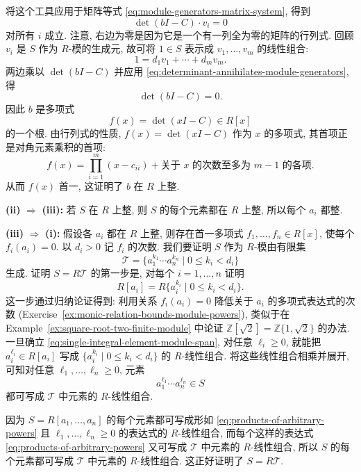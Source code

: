\begin{Proof}
  将这个工具应用于矩阵等式 \eqref{eq:module-generators-matrix-system}, 得到
  \begin{equation}\label{eq:determinant-annihilates-module-generators}
    \det(bI-C)\cdot v_{i}=0
  \end{equation}
  对所有 $i$ 成立. 注意, 右边为零是因为它是一个有一列全为零的矩阵的行列式. 回顾 $v_{i}$ 是 $S$ 作为 $R$-模的生成元, 故可将 $1\in S$ 表示成 $v_{1},\ldots,v_{m}$ 的线性组合:
  \[
    1=d_{1}v_{1}+\cdots+d_{m}v_{m}.
  \]
  两边乘以 $\det(bI-C)$ 并应用 \eqref{eq:determinant-annihilates-module-generators}, 得
  \[
    \det(bI-C)=0.
  \]
  因此 $b$ 是多项式
  \[
    f(x)=\det(xI-C)\in R[x]
  \]
  的一个根. 由行列式的性质, $f(x)=\det(xI-C)$ 作为 $x$ 的多项式, 其首项正是对角元素乘积的首项:
  \[
    f(x)=\prod_{i=1}^{m}(x-c_{ii})+\text{关于 $x$ 的次数至多为 $m-1$ 的各项}.
  \]
  从而 $f(x)$ 首一, 这证明了 $b$ 在 $R$ 上整.

  \textbf{(ii)} $\Rightarrow$ \textbf{(iii):} 若 $S$ 在 $R$ 上整, 则 $S$ 的每个元素都在 $R$ 上整, 所以每个 $a_{i}$ 都整.

  \textbf{(iii)} $\Rightarrow$ \textbf{(i):} 假设各 $a_{i}$ 都在 $R$ 上整, 则存在首一多项式 $f_{1},\ldots,f_{n}\in R[x]$, 使每个 $f_{i}(a_{i})=0$. 以 $d_{i}>0$ 记 $f_{i}$ 的次数. 我们要证明 $S$ 作为 $R$-模由有限集
  \[
    \mathcal{T}=\{a_{1}^{k_{1}}\cdots a_{n}^{k_{n}}\mid 0\leq k_{i}<d_{i}\}
  \]
  生成. 证明 $S=R\mathcal{T}$ 的第一步是, 对每个 $i=1,\ldots,n$ 证明
  \begin{equation}\label{eq:single-integral-element-module-span}
    R[a_{i}]=R\{a_{i}^{k_{i}}\mid 0\leq k_{i}<d_{i}\}.
  \end{equation}
  这一步通过归纳论证得到: 利用关系 $f_{i}(a_{i})=0$ 降低关于 $a_{i}$ 的多项式表达式的次数 (Exercise~\ref{ex:monic-relation-bounds-module-powers}), 类似于在 Example~\ref{ex:square-root-two-finite-module} 中论证 $\mathbb{Z}[\sqrt{2}]=\mathbb{Z}\{1,\sqrt{2}\}$ 的办法. 一旦确立 \eqref{eq:single-integral-element-module-span}, 对任意 $\ell_{i}\geq0$, 就能把 $a_{i}^{\ell_{i}}\in R[a_{i}]$ 写成 $\{a_{i}^{k_{i}}\mid 0\leq k_{i}<d_{i}\}$ 的 $R$-线性组合. 将这些线性组合相乘并展开, 可知对任意 $\ell_{1},\ldots,\ell_{n}\geq0$, 元素
  \begin{equation}\label{eq:products-of-arbitrary-powers}
    a_{1}^{\ell_{1}}\cdots a_{n}^{\ell_{n}}\in S
  \end{equation}
  都可写成 $\mathcal{T}$ 中元素的 $R$-线性组合.

  因为 $S=R[a_{1},\ldots,a_{n}]$ 的每个元素都可写成形如 \eqref{eq:products-of-arbitrary-powers} 且 $\ell_{1},\ldots,\ell_{n}\geq0$ 的表达式的 $R$-线性组合, 而每个这样的表达式 \eqref{eq:products-of-arbitrary-powers} 又可写成 $\mathcal{T}$ 中元素的 $R$-线性组合, 所以 $S$ 的每个元素都可写成 $\mathcal{T}$ 中元素的 $R$-线性组合. 这正好证明了 $S=R\mathcal{T}$.
\end{Proof}

